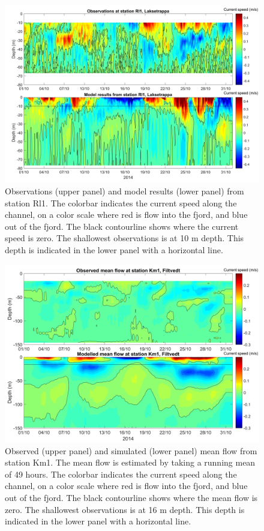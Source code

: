 \begin{figure}[ht]
	\centerline{
		\includegraphics*[trim=0 0 0 0,clip=true,width=\textwidth]{Figurer/AndreS/Rl1_Obs_vs_Mod_v2}}
	\caption{\small Observations (upper panel) and model results (lower panel) from station Rl1. The colorbar indicates the current speed along the channel, on a color scale where red is flow into the fjord, and blue out of the fjord. The black contourline shows where the current speed is zero. The shallowest observations is at 10 m depth. This depth is indicated in the lower panel with a horizontal line.}
	\label{fig:Rl1}
\end{figure}


\clearpage 

\begin{figure}[ht]
	\centerline{
		\includegraphics*[trim=0 0 0 0,clip=true,width=\textwidth]{Figurer/AndreS/Km1_Obs_vs_Mod_mean_v2}}
	\caption{\small Observed (upper panel) and simulated (lower panel) mean flow from station Km1. The mean flow is estimated by taking a running mean of 49 hours. The colorbar indicates the current speed along the channel, on a color scale where red is flow into the fjord, and blue out of the fjord. The black contourline shows where the mean flow is zero. The shallowest observations is at 16 m depth.
This depth is indicated in the lower panel with a horizontal line.}
	\label{fig:Km1_mean}
\end{figure}

